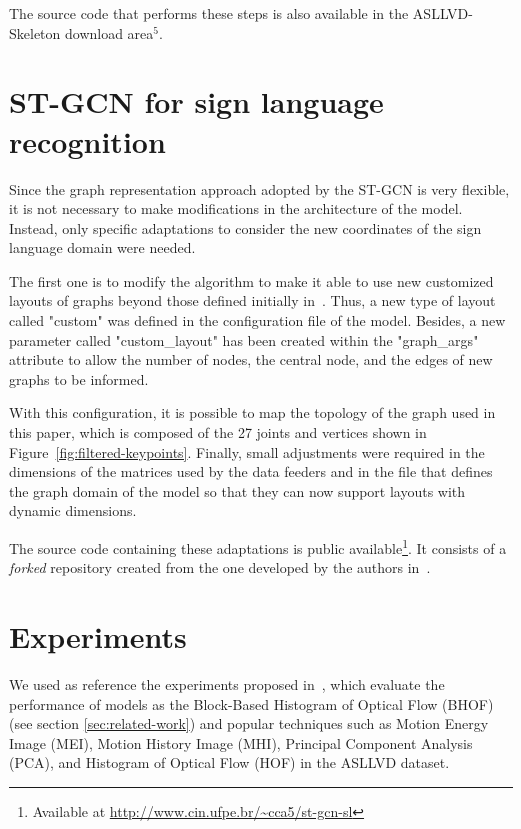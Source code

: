 The source code that performs these steps is also available in the ASLLVD-Skeleton download area$^5$.


\section{ST-GCN for sign language recognition} 
\label{sec:st-gcn-for-sl-recognition}

Since the graph representation approach adopted by the ST-GCN is very flexible, it is not necessary to make modifications in the architecture of the model. Instead, only specific adaptations to consider the new coordinates of the sign language domain were needed.

The first one is to modify the algorithm to make it able to use new customized layouts of graphs beyond those defined initially in~\cite{st-gcn-2018}. Thus, a new type of layout called "custom" was defined in the configuration file of the model. Besides, a new parameter called "custom\_layout" has been created within the "graph\_args" attribute to allow the number of nodes, the central node, and the edges of new graphs to be informed.

With this configuration, it is possible to map the topology of the graph used in this paper, which is composed of the 27 joints and vertices shown in  Figure~\ref{fig:filtered-keypoints}. Finally, small adjustments were required in the dimensions of the matrices used by the data feeders and in the file
that defines the graph domain of the model so that they can now support layouts with dynamic dimensions.

The source code containing these adaptations is public available\footnote{
    Available at \url{http://www.cin.ufpe.br/~cca5/st-gcn-sl}
}. It consists of a \textit{forked} repository created from the one developed by the authors in~\cite{st-gcn-2018}. 


\section{Experiments} 
\label{sec:experiments}

We used as reference the experiments proposed in~\cite{lim-2016}, which evaluate the performance of models as the Block-Based Histogram of Optical Flow (BHOF) (see section \ref{sec:related-work}) and popular techniques such as Motion Energy Image (MEI), Motion History Image (MHI), Principal Component Analysis (PCA), and Histogram of Optical Flow (HOF) in the ASLLVD dataset.

